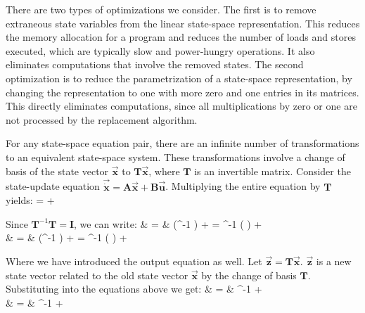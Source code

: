 \label{sec:optimization}

There are two types of optimizations we consider.  The first is to
remove extraneous state variables from the linear state-space
representation. This reduces the memory allocation for a program and
reduces the number of loads and stores executed, which are typically
slow and power-hungry operations. It also eliminates computations that
involve the removed states.  The second optimization is to reduce the
parametrization of a state-space representation, by changing the
representation to one with more zero and one entries in its
matrices. This directly eliminates computations, since all
multiplications by zero or one are not processed by the replacement
algorithm.


    For any state-space equation pair, there are an infinite
number of transformations to an equivalent state-space system.
These transformations involve a change of basis of the state
vector $\vec{\mathbf{x}}$ to $\mathbf{T} \vec{\mathbf{x}}$, where
$\mathbf{T}$ is an invertible matrix. Consider the state-update
equation $\vec{\dot{\mathbf{x}}} = \mathbf{A} \vec{\mathbf{x}} +
\mathbf{B} \vec{\mathbf{u}}$. Multiplying the entire equation by
$\mathbf{T}$ yields:
\starteqnstar
{}  =   +
 
\doneeqnstar

    Since $\mathbf{T}^{-1} \mathbf{T} = \mathbf{I}$, we can write:
\starteqnstar
{}  & = & 
(^{-1} )  + 
 = 
^{-1} ( ) +   \\
 & = &  (^{-1} )
 +   = 
^{-1} ( ) + 
\doneeqnstar

    Where we have introduced the output equation as well. Let
$\vec{\mathbf{z}} = \mathbf{T} \vec{\mathbf{x}}$.
$\vec{\mathbf{z}}$ is a new state vector related to the old state
vector $\vec{\mathbf{x}}$ by the change of basis $\mathbf{T}$.
Substituting into the equations above we get:
\starteqnstar
{} & = &  ^{-1}  +   \\
 & = &  ^{-1}
+ 
\doneeqnstar


